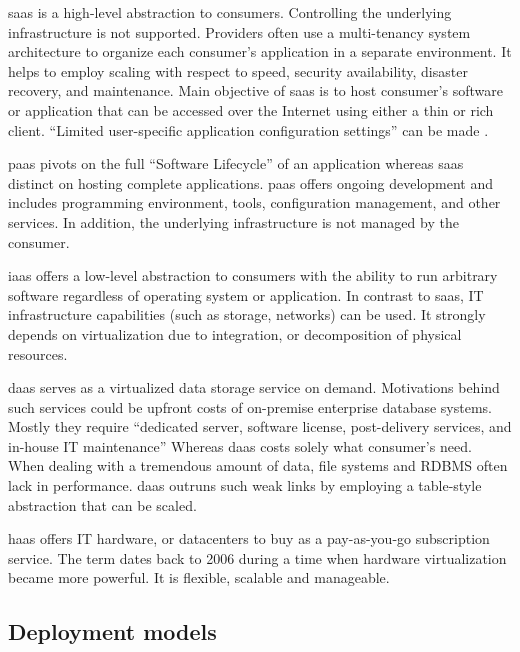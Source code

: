 \ac{saas} is a high-level abstraction to consumers. Controlling the underlying infrastructure is not supported.
Providers often use a multi-tenancy system architecture to organize each consumer's application in a separate environment.
It helps to employ scaling with respect to speed, security availability, disaster recovery, and maintenance.
Main objective of \ac{saas} is to host consumer's software or application that can be accessed over the Internet using either a thin or rich client. \cite{Dillon2010}
\enquote{Limited user-specific application configuration settings} can be made \cite{Mell2011}.

\ac{paas} pivots on the full \enquote{Software Lifecycle} of an application whereas \ac{saas} distinct on hosting complete applications.
\ac{paas} offers ongoing development and includes programming environment, tools, configuration management, and other services.
In addition, the underlying infrastructure is not managed by the consumer. \cite{Mell2011}

\ac{iaas} offers a low-level abstraction to consumers with the ability to run arbitrary software regardless of operating system or application.
In contrast to \ac{saas}, IT infrastructure capabilities (such as storage, networks) can be used.
It strongly depends on virtualization due to integration, or decomposition of physical resources. \cite{Mell2011}

\ac{daas} serves as a virtualized data storage service on demand. Motivations behind such services could be upfront costs of on-premise enterprise database systems. \cite{Dillon2010}
Mostly they require \enquote{dedicated server, software license, post-delivery services, and in-house IT maintenance} \cite{Dillon2010}
Whereas \ac{daas} costs solely what consumer's need.
When dealing with a tremendous amount of data, file systems and RDBMS often lack in performance.
\ac{daas} outruns such weak links by employing a table-style abstraction that can be scaled. \cite{Dillon2010}

\ac{haas} offers IT hardware, or datacenters to buy as a pay-as-you-go subscription service.
The term dates back to 2006 during a time when hardware virtualization became more powerful.
It is flexible, scalable and manageable. \cite{Wang2010}

\subsection{Deployment models}
\label{subsec:cloud-deployment}

